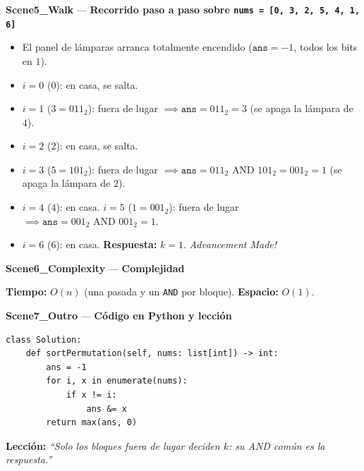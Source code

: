 \documentclass[letterpaper,10pt]{article}
\newcommand{\scene}[2]{\noindent\textbf{\textcolor{mcaqua}{#1}} --- \textbf{#2}\par\vspace{1pt}}
\begin{document}
\begin{shaded}
\scene{Scene5\_Walk}{Recorrido paso a paso sobre \texttt{nums = [0, 3, 2, 5, 4, 1, 6]}}
\begin{itemize}\setlength{\itemsep}{1pt}
  \item El panel de l\'amparas arranca totalmente encendido ($\texttt{ans} = -1$, todos los bits en $1$).
  \item $i=0$ ($0$): en casa, se salta.
  \item $i=1$ ($3 = 011_2$): fuera de lugar $\implies \texttt{ans} = 011_2 = 3$ (se apaga la l\'ampara de $4$).
  \item $i=2$ ($2$): en casa, se salta.
  \item $i=3$ ($5 = 101_2$): fuera de lugar $\implies \texttt{ans} = 011_2 \text{ AND } 101_2 = 001_2 = 1$ (se apaga la l\'ampara de $2$).
  \item $i=4$ ($4$): en casa. $i=5$ ($1 = 001_2$): fuera de lugar $\implies \texttt{ans} = 001_2 \text{ AND } 001_2 = 1$.
  \item $i=6$ ($6$): en casa. \textbf{Respuesta:} $k = 1$. \textit{Advancement Made!}
\end{itemize}

\scene{Scene6\_Complexity}{Complejidad}
\textbf{Tiempo:} $O(n)$ (una pasada y un \texttt{AND} por bloque). \quad \textbf{Espacio:} $O(1)$.
\end{shaded}

\scene{Scene7\_Outro}{C\'odigo en Python y lecci\'on}
\begin{Verbatim}[frame=single,fontsize=\small]
class Solution:
    def sortPermutation(self, nums: list[int]) -> int:
        ans = -1
        for i, x in enumerate(nums):
            if x != i:
                ans &= x
        return max(ans, 0)
\end{Verbatim}
\textbf{Lecci\'on:} \textit{``Solo los bloques fuera de lugar deciden $k$: su AND com\'un es la respuesta.''}
\end{document}
